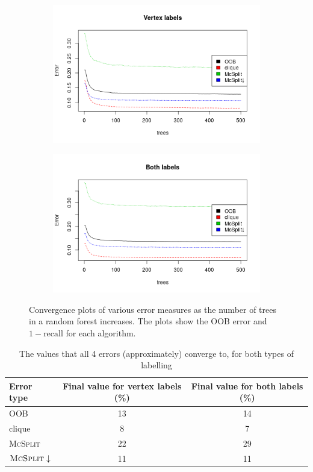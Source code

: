 \documentclass{l4proj}
\theoremstyle{definition}
\theoremstyle{remark}
\begin{document}
\begin{figure}
  \centering
  \begin{subfigure}[t]{0.49\textwidth}
    \centering
    \includegraphics[width=\textwidth]{images/vertex_labels_forest_errors.png}
  \end{subfigure}
  \begin{subfigure}[t]{0.49\textwidth}
    \centering
    \includegraphics[width=\textwidth]{images/both_labels_forest_errors.png}
  \end{subfigure}
  \caption{Convergence plots of various error measures as the number of trees in
    a random forest increases. The plots show the OOB error and $1 -
    \text{recall}$ for each algorithm.}
  \label{fig:forest_errors}
\end{figure}

\begin{table}
  \centering
  \begin{tabular}{l | c c}
    Error type & Final value for vertex labels (\%) & Final value for both labels (\%) \\
    \hline
    OOB & 13 & 14 \\
    clique & 8 & 7 \\
    \textsc{McSplit} & 22 & 29 \\
    $\textsc{McSplit}\downarrow$ & 11 & 11
  \end{tabular}
  \caption{The values that all 4 errors (approximately) converge to, for both
    types of labelling}
  \label{table:errors}
\end{table}
\end{document}
